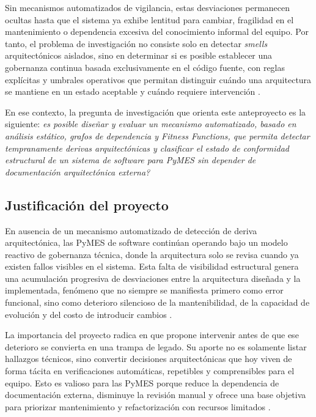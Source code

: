 Sin mecanismos automatizados de vigilancia, estas desviaciones permanecen ocultas hasta que el sistema ya exhibe lentitud para cambiar, fragilidad en el mantenimiento o dependencia excesiva del conocimiento informal del equipo. Por tanto, el problema de investigación no consiste solo en detectar \textit{smells} arquitectónicos aislados, sino en determinar si es posible establecer una gobernanza continua basada exclusivamente en el código fuente, con reglas explícitas y umbrales operativos que permitan distinguir cuándo una arquitectura se mantiene en un estado aceptable y cuándo requiere intervención \parencite{OkooneAgileArchitecture, Klein2022}.

En ese contexto, la pregunta de investigación que orienta este anteproyecto es la siguiente: \textit{\textquestiondown es posible diseñar y evaluar un mecanismo automatizado, basado en análisis estático, grafos de dependencia y \textit{Fitness Functions}, que permita detectar tempranamente derivas arquitectónicas y clasificar el estado de conformidad estructural de un sistema de software para PyMES sin depender de documentación arquitectónica externa?}

\subsection{Justificación del proyecto}
En ausencia de un mecanismo automatizado de detección de deriva arquitectónica, las PyMES de software continúan operando bajo un modelo reactivo de gobernanza técnica, donde la arquitectura solo se revisa cuando ya existen fallos visibles en el sistema. Esta falta de visibilidad estructural genera una acumulación progresiva de desviaciones entre la arquitectura diseñada y la implementada, fenómeno que no siempre se manifiesta primero como error funcional, sino como deterioro silencioso de la mantenibilidad, de la capacidad de evolución y del costo de introducir cambios \parencite{Jolak2025}.

La importancia del proyecto radica en que propone intervenir antes de que ese deterioro se convierta en una trampa de legado. Su aporte no es solamente listar hallazgos técnicos, sino convertir decisiones arquitectónicas que hoy viven de forma tácita en verificaciones automáticas, repetibles y comprensibles para el equipo. Esto es valioso para las PyMES porque reduce la dependencia de documentación externa, disminuye la revisión manual y ofrece una base objetiva para priorizar mantenimiento y refactorización con recursos limitados \parencite{Hamed2023, Klein2022}.

